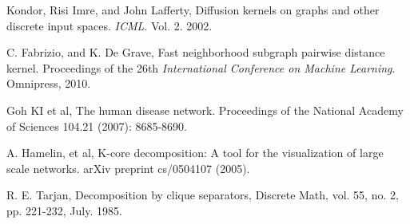 \documentclass{esannV2}
\begin{document}
%

\begin{footnotesize}

\begin{thebibliography}{99}

 Kondor, Risi Imre, and John Lafferty, Diffusion kernels on graphs and other discrete input spaces. \emph{ICML}. Vol. 2. 2002.

 C. Fabrizio, and K. De Grave, Fast neighborhood subgraph pairwise distance kernel. Proceedings of the 26th \emph{International Conference on Machine Learning}. Omnipress, 2010.

 Goh KI et al, The human disease network. Proceedings of the National Academy of Sciences 104.21 (2007): 8685-8690.

 A. Hamelin, et al, K-core decomposition: A tool for the visualization of large scale networks. arXiv preprint cs/0504107 (2005).

 R. E. Tarjan, Decomposition by clique separators, Discrete Math, vol. 55, no. 2, pp. 221-232, July. 1985.

\end{thebibliography}


%
%

\end{footnotesize}

\end{document}
